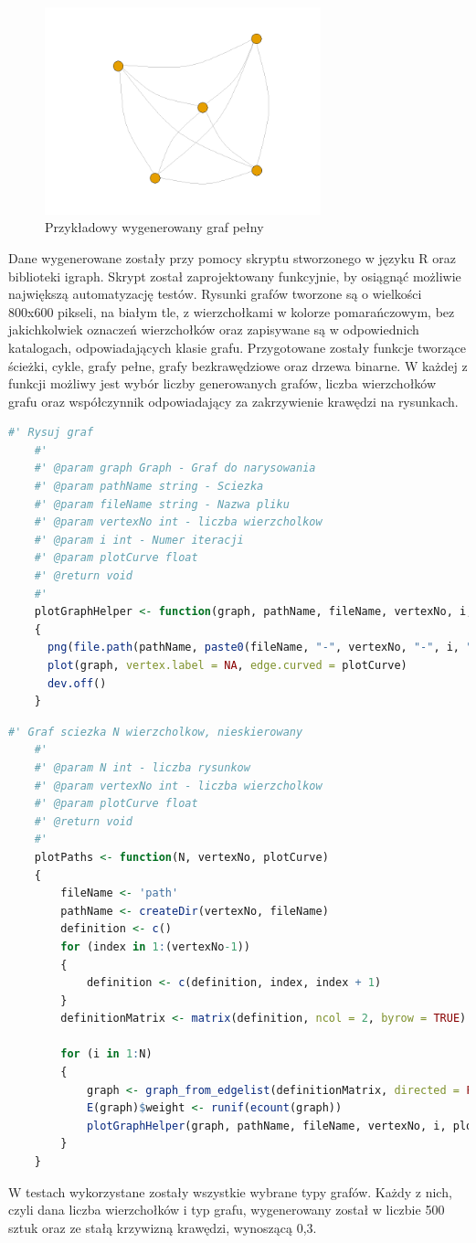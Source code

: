 \begin{figure}[ht]
	\centering
	\includegraphics[height=6cm]{resources/tests/images/gen-graph_full.png}
	\caption{Przykładowy wygenerowany graf pełny}
	\label{Fig:tests-generation-1}
\end{figure}
\FloatBarrier

Dane wygenerowane zostały przy pomocy skryptu stworzonego w języku R oraz biblioteki igraph.
Skrypt został zaprojektowany funkcyjnie, by osiągnąć możliwie największą automatyzację testów.
Rysunki grafów tworzone są o wielkości 800x600 pikseli, na białym tle, z wierzchołkami w kolorze pomarańczowym,
bez jakichkolwiek oznaczeń wierzchołków oraz zapisywane są w odpowiednich katalogach, odpowiadających klasie grafu.
Przygotowane zostały funkcje tworzące ścieżki, cykle, grafy pełne, grafy bezkrawędziowe oraz drzewa binarne.
W każdej z funkcji możliwy jest wybór liczby generowanych grafów, liczba wierzchołków grafu
oraz współczynnik odpowiadający za zakrzywienie krawędzi na rysunkach.

\begin{lstlisting}[language=R,caption=Listing skryptu rysującego grafy,label={tests-generation-1}]
	#' Rysuj graf
	#'
	#' @param graph Graph - Graf do narysowania
	#' @param pathName string - Sciezka
	#' @param fileName string - Nazwa pliku
	#' @param vertexNo int - liczba wierzcholkow
	#' @param i int - Numer iteracji
	#' @param plotCurve float
	#' @return void
	#'
	plotGraphHelper <- function(graph, pathName, fileName, vertexNo, i, plotCurve)
	{
	  png(file.path(pathName, paste0(fileName, "-", vertexNo, "-", i, ".png")), width = 800, height = 600)
	  plot(graph, vertex.label = NA, edge.curved = plotCurve)
	  dev.off()
	}
\end{lstlisting}

\begin{lstlisting}[language=R,caption=Listing funkcji tworzącej ścieżkę,label={tests-generation-2}]
	#' Graf sciezka N wierzcholkow, nieskierowany
	#'
	#' @param N int - liczba rysunkow
	#' @param vertexNo int - liczba wierzcholkow
	#' @param plotCurve float
	#' @return void
	#'
	plotPaths <- function(N, vertexNo, plotCurve)
	{
		fileName <- 'path'
		pathName <- createDir(vertexNo, fileName)
		definition <- c()
		for (index in 1:(vertexNo-1))
		{
			definition <- c(definition, index, index + 1)
		}
		definitionMatrix <- matrix(definition, ncol = 2, byrow = TRUE)
		
		for (i in 1:N)
		{
			graph <- graph_from_edgelist(definitionMatrix, directed = FALSE)
			E(graph)$weight <- runif(ecount(graph))
			plotGraphHelper(graph, pathName, fileName, vertexNo, i, plotCurve)
		}
	}
\end{lstlisting}

W testach wykorzystane zostały wszystkie wybrane typy grafów.
Każdy z nich, czyli dana liczba wierzchołków i typ grafu, wygenerowany został w liczbie 500 sztuk
oraz ze stałą krzywizną krawędzi, wynoszącą 0,3.